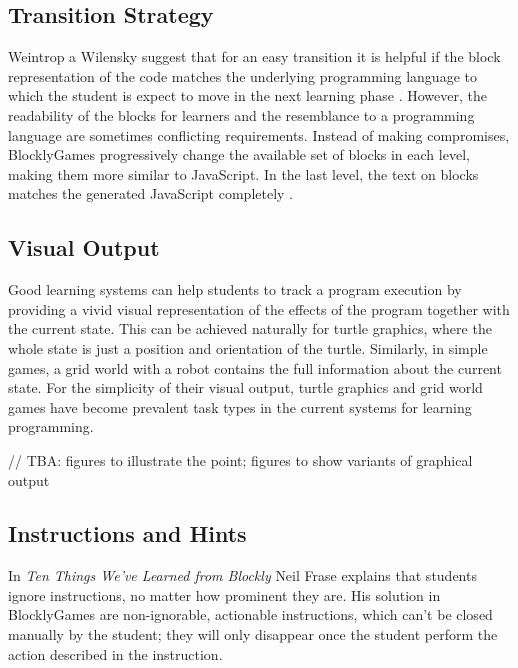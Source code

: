 \documentclass[
    digital,    %
    oneside,    %
    color,
    11pt,
    nocover,
    notable,
    nolof,
    nolot,
    final
]{fithesis3}
\begin{document}
\subsection{Transition Strategy}
\label{sec:transition-strategy}
Weintrop a Wilensky suggest that for an easy transition
  it is helpful if the block representation of the code
  matches the underlying programming language
  to which the student is expect to move in the next learning phase
  \cite{challenges-of-blocks-based-environments}.
However, the readability of the blocks for learners
  and the resemblance to a programming language
  are sometimes conflicting requirements.
Instead of making compromises,
  BlocklyGames progressively change the available set of blocks in each level,
  making them more similar to JavaScript.
In the last level,
  the text on blocks matches the generated JavaScript completely
  \cite{blockly-10-things}.


\subsection{Visual Output}
\label{sec:visual-output}

Good learning systems can help students to track a program execution
  by providing a vivid visual representation of the effects of the program
  together with the current state.
This can be achieved naturally for turtle graphics,
  where the whole state is just a position and orientation of the turtle.
Similarly, in simple games, a grid world with a robot
  contains the full information about the current state.
For the simplicity of their visual output,
  turtle graphics and grid world games have become prevalent task types
  in the current systems for learning programming.

// TBA: figures to illustrate the point; figures to show variants of graphical output


\subsection{Instructions and Hints}
\label{sec:instructions-and-hints}

In \emph{Ten Things We’ve Learned from Blockly} \cite{blockly-10-things}
  Neil Frase explains that students ignore instructions,
  no matter how prominent they are.
His solution in BlocklyGames are non-ignorable, actionable instructions,
  which can’t be closed manually by the student;
  they will only disappear once the student perform the action described in the instruction.
\end{document}
